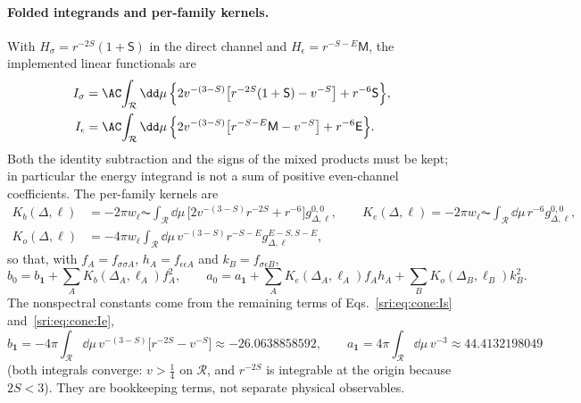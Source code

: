 \paragraph{Folded integrands and per-family kernels.} With $H_\sigma=r^{-2S}(1+\mathsf S)$ in the direct channel and
$H_\epsilon=r^{-S-E}\mathsf M$, the implemented linear functionals are
\begin{align}
 I_\sigma&=\AC\!\int_{\mathcal R}\dd\mu\,\Bigl\{2v^{-(3-S)}\bigl[r^{-2S}(1+\mathsf S)-v^{-S}\bigr]+r^{-6}\mathsf S\Bigr\},
 \label{sri:eq:cone:Is}\\
 I_\epsilon&=\AC\!\int_{\mathcal R}\dd\mu\,\Bigl\{2v^{-(3-S)}\bigl[r^{-S-E}\mathsf M-v^{-S}\bigr]+r^{-6}\mathsf E\Bigr\}.
 \label{sri:eq:cone:Ie}
\end{align}
Both the identity subtraction and the signs of the mixed products must be kept; in particular the energy integrand is
not a sum of positive even-channel coefficients. The per-family kernels are
\begin{equation}
\begin{aligned}
 K_b(\Delta,\ell)&=-2\pi w_\ell\AC\!\int_{\mathcal R}\dd\mu\,\bigl[2v^{-(3-S)}r^{-2S}+r^{-6}\bigr]g_{\Delta,\ell}^{0,0},\qquad
 K_e(\Delta,\ell)=-2\pi w_\ell\AC\!\int_{\mathcal R}\dd\mu\,r^{-6}g_{\Delta,\ell}^{0,0},\\
 K_o(\Delta,\ell)&=-4\pi w_\ell\int_{\mathcal R}\dd\mu\,v^{-(3-S)}r^{-S-E}g_{\Delta,\ell}^{E-S,S-E},
\end{aligned}
 \label{sri:eq:cone:kernels}
\end{equation}
so that, with $f_A=f_{\sigma\sigma A}$, $h_A=f_{\epsilon\epsilon A}$ and $k_B=f_{\sigma\epsilon B}$,
\begin{equation}
 b_0=b_{\mathbf 1}+\sum_AK_b(\Delta_A,\ell_A)f_A^2,\qquad
 a_0=a_{\mathbf 1}+\sum_AK_e(\Delta_A,\ell_A)f_Ah_A+\sum_BK_o(\Delta_B,\ell_B)k_B^2 .
 \label{sri:eq:cone:decomp}
\end{equation}
The nonspectral constants come from the remaining terms of Eqs.~\eqref{sri:eq:cone:Is} and~\eqref{sri:eq:cone:Ie},
\begin{equation}
 b_{\mathbf 1}=-4\pi\!\int_{\mathcal R}\dd\mu\,v^{-(3-S)}\bigl[r^{-2S}-v^{-S}\bigr]\approx-26.0638858592,\qquad
 a_{\mathbf 1}=4\pi\!\int_{\mathcal R}\dd\mu\,v^{-3}\approx44.4132198049
\end{equation}
(both integrals converge: $v>\frac14$ on $\mathcal R$, and $r^{-2S}$ is integrable at the origin because $2S<3$). They are bookkeeping terms, not separate physical
observables.

